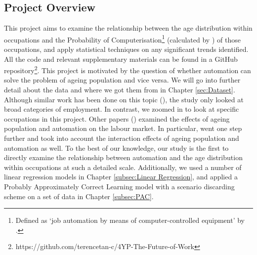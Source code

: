 \documentclass[11pt]{article}
\begin{document}

\subsection{Project Overview}
\label{subsec:projectoverview}
This project aims to examine the relationship between the age distribution within occupations and the Probability of Computerisation\footnote{Defined as `job automation by means of computer-controlled equipment' by \cite{osborne2017future}.} (calculated by \cite{futureofemployment}) of those occupations, and apply statistical techniques on any significant trends identified. All the code and relevant supplementary materials can be found in a GitHub repository\footnote{https://github.com/terencetan-c/4YP-The-Future-of-Work}. This project is motivated by the question of whether automation can solve the problem of ageing population and vice versa. We will go into further detail about the data and where we got them from in Chapter \ref{sec:Dataset}. Although similar work has been done on this topic (\cite{twinthreats}), the study only looked at broad categories of employment. In contrast, we zoomed in to look at specific occupations in this project. Other papers (\cite{10.1257/aer.p20171101,10.1371/journal.pone.0263704}) examined the effects of ageing population and automation on the labour market. In particular, \cite{10.1371/journal.pone.0263704} went one step further and took into account the interaction effects of ageing population and automation as well. To the best of our knowledge, our study is the first to directly examine the relationship between automation and the age distribution within occupations at such a detailed scale. Additionally, we used a number of linear regression models in Chapter \ref{subsec:Linear Regression}, and applied a Probably Approximately Correct Learning model with a scenario discarding scheme on a set of data in Chapter \ref{subsec:PAC}.

\end{document}
